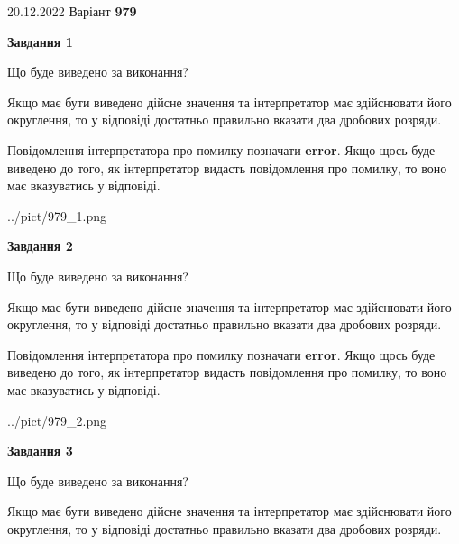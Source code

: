 \documentclass[12pt, ukrainian]{article}
\begin{document}
{20.12.2022 Варіант \No \textbf { 979 }\par}
{
\begin {Large}

{\begin {center}\textbf{Завдання 1}\end {center}}\par
Що буде виведено за виконання? \par

Якщо має бути виведено дійсне значення та інтерпретатор має здійснювати його округлення, 
то у відповіді достатньо правильно вказати два дробових розряди.

Повідомлення інтерпретатора про помилку позначати \textbf{error}.
Якщо щось буде виведено до того, як інтерпретатор видасть повідомлення про помилку, 
то воно має вказуватись у відповіді. \par

\begin{center}
	{../pict/979_1.png}
\end{center}
\newpage

{\begin {center}\textbf{Завдання 2}\end {center}}\par
Що буде виведено за виконання? \par

Якщо має бути виведено дійсне значення та інтерпретатор має здійснювати його округлення, 
то у відповіді достатньо правильно вказати два дробових розряди.

Повідомлення інтерпретатора про помилку позначати \textbf{error}.
Якщо щось буде виведено до того, як інтерпретатор видасть повідомлення про помилку, 
то воно має вказуватись у відповіді. \par

\begin{center}
	{../pict/979_2.png}
\end{center}
\newpage

{\begin {center}\textbf{Завдання 3}\end {center}}\par
Що буде виведено за виконання? \par

Якщо має бути виведено дійсне значення та інтерпретатор має здійснювати його округлення, 
то у відповіді достатньо правильно вказати два дробових розряди.


\end{Large}}
\end{document}
